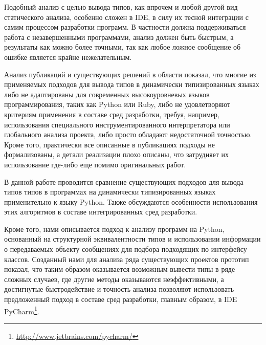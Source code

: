 Подобный анализ с целью вывода типов, как впрочем и любой другой вид
статического анализа, особенно сложен в IDE, в силу их тесной
интеграции с самим процессом разработки программ. В частности должна
поддерживаться работа с незавершенными программами, анализ должен быть быстрым,
а результаты как можно более точными, так как любое ложное сообщение об ошибке
является крайне нежелательным.

Анализ публикаций и существующих решений в области показал, что
многие из применяемых подходов для вывода типов в динамически типизированных языках либо
не адаптированы для современных высокоуровневых языков программирования, таких
как Python или Ruby, либо не удовлетворяют критериям применения в составе сред
разработки, требуя, например, использования специального инструментированного
интерпретатора или глобального анализа проекта, либо просто
обладают недостаточной точностью. Кроме того, практически все описанные в публикациях
подходы не формализованы, а детали реализации плохо описаны, что
затрудняет их использование где-либо еще помимо оригинальных работ. 

В данной работе проводится сравнение существующих подходов для
вывода типов типов в программах на динамически типизированных языках
применительно к языку Python. Также обсуждаются особенности использования этих
алгоритмов в составе интегрированных сред разработки.

Кроме того, нами описывается подход к анализу программ на Python, основанный на
структурной эквивалентности типов и использовании информации о передаваемых
объекту сообщениях для подбора подходящих по интерфейсу классов. Созданный нами
для анализа ряда существующих проектов прототип показал, что таким образом
оказывается возможным вывести типы в ряде сложных случаев, где другие методы
оказываются неэффективными, а достигнутые быстродействие и точность анализа
позволяют использовать предложенный подход в составе сред разработки, главным
образом, в IDE PyCharm\footnote{\url{http://www.jetbrains.com/pycharm/}}.


